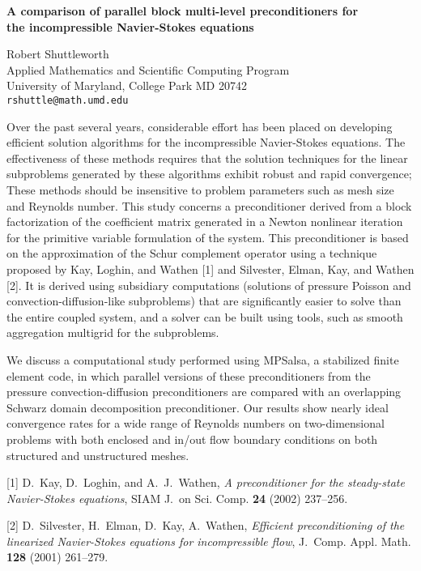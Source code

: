 \documentclass{report}
\begin{document}

\begin{center}
{\large
{\bf A comparison of parallel block multi-level preconditioners for \\
	the incompressible Navier-Stokes equations}}

	Robert Shuttleworth \\
	Applied Mathematics and Scientific Computing Program \\
	University of Maryland, College Park MD 20742 \\
	{\tt rshuttle@math.umd.edu}
\end{center}
Over the past several years, considerable effort has been
placed on developing efficient solution algorithms for the
incompressible Navier-Stokes equations. The effectiveness of
these methods requires that the solution techniques for the
linear subproblems generated by these algorithms exhibit
robust and rapid convergence; These methods should be
insensitive to problem parameters such as mesh size and
Reynolds number. This study concerns a preconditioner
derived from a block factorization of the coefficient matrix
generated in a Newton nonlinear iteration for the primitive
variable formulation of the system. This preconditioner is
based on the approximation of the Schur complement operator
using a technique proposed by Kay, Loghin, and Wathen [1]
and Silvester, Elman, Kay, and Wathen [2]. It is derived
using subsidiary computations (solutions of pressure Poisson
and convection-diffusion-like subproblems) that are
significantly easier to solve than the entire coupled
system, and a solver can be built using tools, such as
smooth aggregation multigrid for the subproblems.

We discuss
a computational study performed using MPSalsa, a stabilized
finite element code, in which parallel versions of these
preconditioners from the pressure convection-diffusion
preconditioners are compared with an overlapping Schwarz
domain decomposition preconditioner.  Our results show
nearly ideal convergence rates for a wide range of Reynolds
numbers on two-dimensional problems with both enclosed and
in/out flow boundary conditions on both structured and
unstructured meshes.

[1] D.~Kay, D.~Loghin, and A.~J.~Wathen,
{\em A preconditioner for the steady-state
Navier-Stokes equations},
SIAM J.~on Sci. Comp. {\bf 24} (2002) 237--256.

[2] D.~Silvester, H.~Elman, D.~Kay, A.~Wathen,
{\em Efficient preconditioning of the linearized
Navier-Stokes equations for incompressible flow},
J.~Comp. Appl. Math. {\bf 128} (2001) 261--279.


\end{document}
